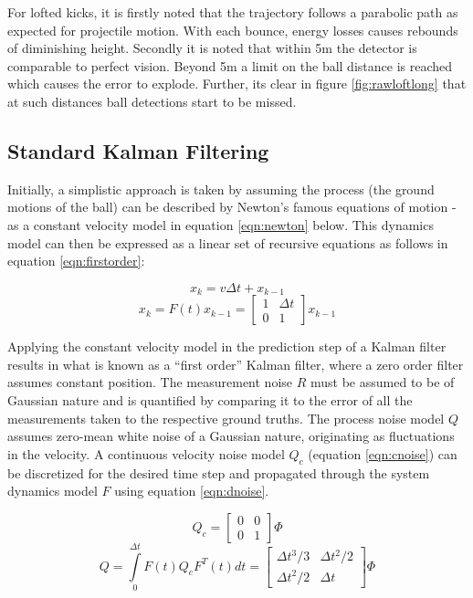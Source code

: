 \documentclass[a4paper,twoside,12pt]{report}
\begin{document}
For lofted kicks, it is firstly noted that the trajectory follows a parabolic path as expected for projectile motion. With each bounce, energy losses causes rebounds of diminishing height. Secondly it is noted that within 5m the detector is comparable to perfect vision. Beyond 5m a limit on the ball distance is reached which causes the error to explode. Further, its clear in figure \ref{fig:rawloftlong} that at such distances ball detections start to be missed.

\subsection{Standard Kalman Filtering}

Initially, a simplistic approach is taken by assuming the process (the ground motions of the ball) can be described by Newton's famous equations of motion - as a constant velocity model in equation \ref{eqn:newton} below. This dynamics model can then be expressed as a linear set of recursive equations as follows in equation \ref{eqn:firstorder}:

\begin{equation} 
x_k=v\Delta t + x_{k-1}
\label{eqn:newton}
\end{equation}
\begin{equation} 
x_k
=
F(t)x_{k-1}
=
\begin{bmatrix}
    1 & \Delta t \\
    0 & 1 
\end{bmatrix}
x_{k-1}
\label{eqn:firstorder}
\end{equation}

Applying the constant velocity model in the prediction step of a Kalman filter results in what is known as a ``first order'' Kalman filter, where a zero order filter assumes constant position. The measurement noise $R$ must be assumed to be of Gaussian nature and is quantified by comparing it to the error of all the measurements taken to the respective ground truths. The process noise model $Q$ assumes zero-mean white noise of a Gaussian nature, originating as fluctuations in the velocity. A continuous velocity noise model $Q_c$ (equation \ref{eqn:cnoise}) can be discretized for the desired time step and propagated through the system dynamics model $F$ using equation \ref{eqn:dnoise}. \citep{kalmanpy}

\begin{equation} 
Q_c
=
\begin{bmatrix}
    0 & 0 \\
    0 & 1 
\end{bmatrix}
\Phi
\label{eqn:cnoise}
\end{equation}
\begin{equation} 
Q = \int\limits_0^{\Delta t} F(t)Q_cF^T(t)dt
=
\begin{bmatrix}
    \Delta t^3/3 & \Delta t^2/2 \\
    \Delta t^2/2 & \Delta t 
\end{bmatrix}
\Phi
\label{eqn:dnoise}
\end{equation}
\end{document}
